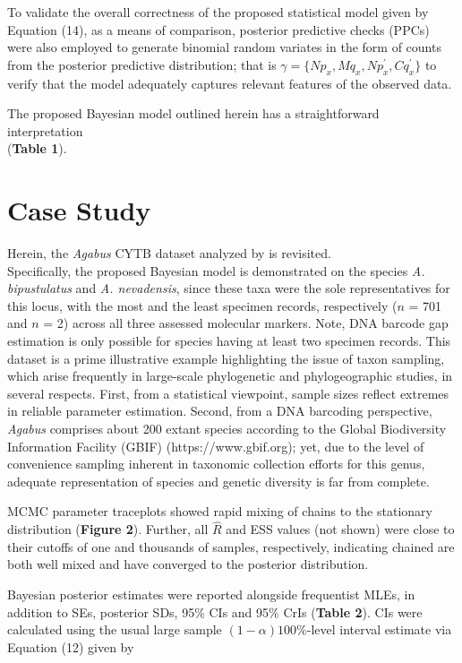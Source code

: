 \documentclass[12pt]{article}
\begin{document}
To validate the overall correctness of the proposed statistical model given by Equation (14), as a means of comparison, posterior predictive checks (PPCs) were also employed to generate binomial random variates in the form of counts from the posterior predictive distribution; that is $\gamma = \{Np_x, Mq_x, Np^{'}_x, Cq^{'}_x\}$ to verify that the model adequately captures relevant features of the observed data. 

The proposed Bayesian model outlined herein has a straightforward interpretation \\ (\textbf{Table 1}). 

\section{Case Study}

Herein, the \textit{Agabus} CYTB dataset analyzed by \citet{phillips2024measure} is revisited. \\ Specifically, the proposed Bayesian model is demonstrated on the species \textit{A. bipustulatus} and \textit{A. nevadensis}, since these taxa were the sole representatives for this locus, with the most and the least specimen records, respectively ($n$ = 701 and $n$ = 2) across all three assessed molecular markers. Note, DNA barcode gap estimation is only possible for species having at least two specimen records. This dataset is a prime illustrative example highlighting the issue of taxon sampling, which arise frequently in large-scale phylogenetic and phylogeographic studies, in several respects. First, from a statistical viewpoint, sample sizes reflect extremes in reliable parameter estimation. Second, from a DNA barcoding perspective, \textit{Agabus} comprises about 200 extant species according to the Global Biodiversity Information Facility (GBIF) (https://www.gbif.org); yet, due to the level of convenience sampling inherent in taxonomic collection efforts for this genus, adequate representation of species and genetic diversity is far from complete. 

MCMC parameter traceplots showed rapid mixing of chains to the stationary distribution (\textbf{Figure 2}). Further, all $\hat{R}$ and ESS values (not shown) were close to their cutoffs of one and thousands of samples, respectively, indicating chained are both well mixed and have converged to the posterior distribution.  

Bayesian posterior estimates were reported alongside frequentist MLEs, in addition to SEs, posterior SDs, 95\% CIs and 95\% CrIs (\textbf{Table 2}). CIs were calculated using the usual large sample  $(1-\alpha)100\%$-level interval estimate via Equation (12) given by
\end{document}
